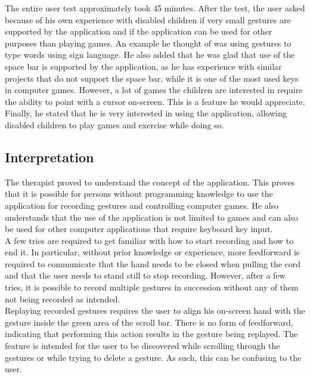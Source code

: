 The entire user test approximately took 45 minutes. After the test, the user asked because of his own experience with disabled children if very small gestures are supported by the application and if the application can be used for other purposes than playing games. An example he thought of was using gestures to type words using sign language. He also added that he was glad that use of the space bar
is supported by the application, as he has experience with similar projects that do not support the space bar, while it is one of the most used keys in computer games. However, a lot of games the children are interested in require the ability to point with a cursor on-screen. This is a feature he would appreciate. Finally, he stated that he is very interested in using the application, allowing disabled children to play games and exercise while doing so.


\subsection{Interpretation}

The therapist proved to understand the concept of the application. This proves that it is possible for persons without programming knowledge to use the application for recording gestures and controlling computer games. He also understands that the use of the application is not limited to games and can also be used for other computer applications that require keyboard key input.\\

A few tries are required to get familiar with how to start recording and how to end it. In particular, without prior knowledge or experience, more feedforward is required to communicate that the hand needs to be closed when pulling the cord and that the user needs to stand still to stop recording. However, after a few tries, it is possible to record multiple gestures in succession without any of them not being recorded as intended.\\

Replaying recorded gestures requires the user to align his on-screen hand with the gesture inside the green area of the scroll bar. There is no form of feedforward, indicating that performing this action results in the gesture being replayed. The feature is intended for the user to be discovered while scrolling through the gestures or while trying to delete a gesture. As such, this can be confusing to the user.\\

